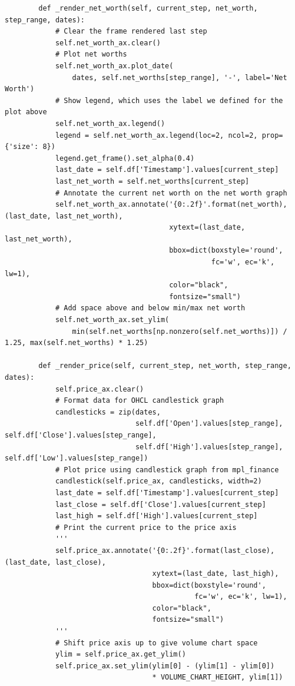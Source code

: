 \documentclass{article}
\begin{document}
\begin{lstlisting}
        def _render_net_worth(self, current_step, net_worth, step_range, dates):
            # Clear the frame rendered last step
            self.net_worth_ax.clear()
            # Plot net worths
            self.net_worth_ax.plot_date(
                dates, self.net_worths[step_range], '-', label='Net Worth')
            # Show legend, which uses the label we defined for the plot above
            self.net_worth_ax.legend()
            legend = self.net_worth_ax.legend(loc=2, ncol=2, prop={'size': 8})
            legend.get_frame().set_alpha(0.4)
            last_date = self.df['Timestamp'].values[current_step]
            last_net_worth = self.net_worths[current_step]
            # Annotate the current net worth on the net worth graph
            self.net_worth_ax.annotate('{0:.2f}'.format(net_worth), (last_date, last_net_worth),
                                       xytext=(last_date, last_net_worth),
                                       bbox=dict(boxstyle='round',
                                                 fc='w', ec='k', lw=1),
                                       color="black",
                                       fontsize="small")
            # Add space above and below min/max net worth
            self.net_worth_ax.set_ylim(
                min(self.net_worths[np.nonzero(self.net_worths)]) / 1.25, max(self.net_worths) * 1.25)
    
        def _render_price(self, current_step, net_worth, step_range, dates):
            self.price_ax.clear()
            # Format data for OHCL candlestick graph
            candlesticks = zip(dates,
                               self.df['Open'].values[step_range], self.df['Close'].values[step_range],
                               self.df['High'].values[step_range], self.df['Low'].values[step_range])
            # Plot price using candlestick graph from mpl_finance
            candlestick(self.price_ax, candlesticks, width=2)
            last_date = self.df['Timestamp'].values[current_step]
            last_close = self.df['Close'].values[current_step]
            last_high = self.df['High'].values[current_step]
            # Print the current price to the price axis
            '''
            self.price_ax.annotate('{0:.2f}'.format(last_close), (last_date, last_close),
                                   xytext=(last_date, last_high),
                                   bbox=dict(boxstyle='round',
                                             fc='w', ec='k', lw=1),
                                   color="black",
                                   fontsize="small")
            '''
            # Shift price axis up to give volume chart space
            ylim = self.price_ax.get_ylim()
            self.price_ax.set_ylim(ylim[0] - (ylim[1] - ylim[0])
                                   * VOLUME_CHART_HEIGHT, ylim[1])
    

\end{lstlisting}
\end{document}
